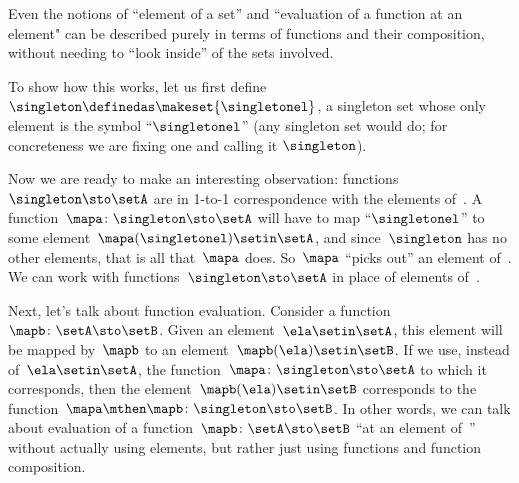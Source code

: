 \begin{example}
    Even the notions of ``element of a set'' and ``evaluation of a function at an element" can be described purely in terms of functions and their composition, without needing to ``look inside'' of the sets involved.

    To show how this works, let us first define $\singleton \definedas \makeset{\singletonel}$, a singleton set whose only element is the symbol ``$\singletonel$'' (any singleton set would do; for concreteness we are fixing one and calling it $\singleton$).

    Now we are ready to make an interesting observation: functions~$\singleton \sto \setA$ are in 1-to-1 correspondence with the elements of~\setA.
    A function~$\mapa\colon \singleton \sto \setA$ will have to map ``$\singletonel$'' to some element~$\mapa(\singletonel) \setin\setA$, and since~$\singleton$ has no other elements, that is all that~$\mapa$ does.
    So~$\mapa$ ``picks out'' an element of~\setA.
    We can work with functions~$\singleton \sto \setA$ in place of elements of~\setA.

    Next, let's talk about function evaluation.
    Consider a function~$\mapb \colon \setA \sto \setB$.
    Given an element~$\ela \setin\setA$, this element will be mapped by~$\mapb$ to an element~$\mapb(\ela) \setin\setB$.
    If we use, instead of~$\ela \setin\setA$, the function~$\mapa \colon \singleton \sto \setA$ to which it corresponds, then the element~$\mapb(\ela) \setin\setB$ corresponds to the function~$\mapa \mthen \mapb\colon \singleton \sto \setB$.
    In other words, we can talk about evaluation of a function~$\mapb \colon \setA \sto \setB$ ``at an element of~\setA'' without actually using elements, but rather just using functions and function composition.
\end{example}
